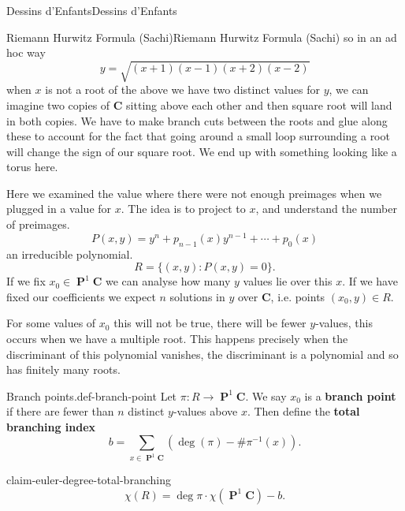 \documentclass[10pt,]{book}
\newcommand{\terminology}[1]{\textbf{#1}}
\numberwithin{equation}{section}
\newcommand{\inv}{^{-1}}
\newcommand{\CC}{\mathbf{C}}
\DeclareMathOperator{\PP}{\mathbf{P}}
\begin{document}
\begin{chapterptx}{Dessins d'Enfants}{}{Dessins d'Enfants}{}{}
\begin{sectionptx}{Riemann Hurwitz Formula (Sachi)}{}{Riemann Hurwitz Formula (Sachi)}{}{}
so in an ad hoc way%
\begin{equation*}
y = \sqrt{(x+1)(x-1)(x+2)(x-2)}
\end{equation*}
when \(x\) is not a root of the above we have two distinct values for \(y\), we can imagine two copies of \(\CC\) sitting above each other and then square root will land in both copies. We have to make branch cuts between the roots and glue along these to account for the fact that going around a small loop surrounding a root will change the sign of our square root. We end up with something looking like a torus here.%
\par
\hypertarget{p-512}{}%
Here we examined the value where there were not enough preimages when we plugged in a value for \(x\). The idea is to project to \(x\), and understand the number of preimages.%
\begin{equation*}
P(x,y) = y^n + p_{n-1}(x) y^{n-1} + \cdots + p_0(x)
\end{equation*}
an  irreducible polynomial.%
\begin{equation*}
R= \{(x,y) : P(x,y) = 0\}\text{.}
\end{equation*}
If we fix \(x_0 \in \PP^1 \CC\) we can analyse how many \(y\) values lie over this \(x\). If we have fixed our coefficients we expect \(n\) solutions in \(y\) over \(\CC\), i.e. points \((x_0,y)\in R\).%
\par
\hypertarget{p-513}{}%
For some values of \(x_0\) this will not be true, there will be fewer \(y\)-values, this occurs when we have a multiple root. This happens precisely when the discriminant of this polynomial vanishes, the discriminant is a polynomial and so has finitely many roots.%
\begin{definition}{Branch points.}{def-branch-point}%
\hypertarget{p-514}{}%
Let \(\pi\colon R \to \PP^1 \CC\). We say \(x_0\) is a \terminology{branch point} if there are fewer than \(n\) distinct \(y\)-values above \(x\). Then define the \terminology{total branching index}%
\begin{equation*}
b = \sum_{x\in \PP^1 \CC} (\deg(\pi) - \# \pi\inv (x))\text{.}
\end{equation*}
%
\end{definition}
\begin{claim}{}{}{claim-euler-degree-total-branching}%
\hypertarget{p-515}{}%
%
\begin{equation*}
\chi(R) = \deg \pi \cdot \chi(\PP^1\CC)  - b\text{.}
\end{equation*}
%
\end{claim}

\end{sectionptx}
\end{chapterptx}
\end{document}
